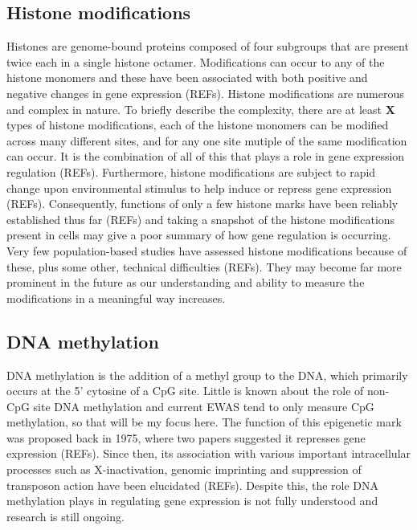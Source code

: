 \documentclass[11pt,twoside]{bristolthesis}
\begin{document}
\hypertarget{histone-modifications}{%
\subsection{Histone modifications}\label{histone-modifications}}

Histones are genome-bound proteins composed of four subgroups that are present twice each in a single histone octamer. Modifications can occur to any of the histone monomers and these have been associated with both positive and negative changes in gene expression (REFs). Histone modifications are numerous and complex in nature. To briefly describe the complexity, there are at least \textbf{X} types of histone modifications, each of the histone monomers can be modified across many different sites, and for any one site mutiple of the same modification can occur. It is the combination of all of this that plays a role in gene expression regulation (REFs). Furthermore, histone modifications are subject to rapid change upon environmental stimulus to help induce or repress gene expression (REFs). Consequently, functions of only a few histone marks have been reliably established thus far (REFs) and taking a snapshot of the histone modifications present in cells may give a poor summary of how gene regulation is occurring. Very few population-based studies have assessed histone modifications because of these, plus some other, technical difficulties (REFs). They may become far more prominent in the future as our understanding and ability to measure the modifications in a meaningful way increases.

\hypertarget{dna-methylation}{%
\subsection{DNA methylation}\label{dna-methylation}}

DNA methylation is the addition of a methyl group to the DNA, which primarily occurs at the 5' cytosine of a CpG site. Little is known about the role of non-CpG site DNA methylation and current EWAS tend to only measure CpG methylation, so that will be my focus here. The function of this epigenetic mark was proposed back in 1975, where two papers suggested it represses gene expression (REFs). Since then, its association with various important intracellular processes such as X-inactivation, genomic imprinting and suppression of transposon action have been elucidated (REFs). Despite this, the role DNA methylation plays in regulating gene expression is not fully understood and research is still ongoing.
\end{document}
